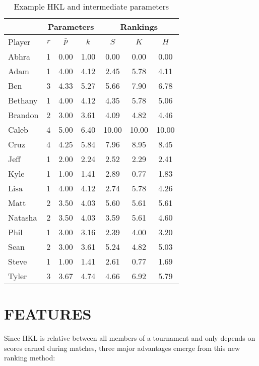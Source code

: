 \documentclass[letterpaper, 10 pt, conference]{ieeeconf}  %
\begin{document}
\begin{table}[hb]
        \begin{tabular}{lccc|ccc}
                \toprule
                        & \multicolumn{3}{c}{Parameters} & \multicolumn{3}{c}{Rankings} \\
                \midrule
                Player  & $r$   & $\bar{p}$ & $k$ & $S$ & $K$   & $H$ \\
                \midrule
                Abhra	& 1	& 0.00	& 1.00	& 0.00	& 0.00	& 0.00 \\
                Adam	& 1	& 4.00	& 4.12	& 2.45	& 5.78	& 4.11 \\
                Ben	& 3	& 4.33	& 5.27	& 5.66	& 7.90	& 6.78 \\
                Bethany	& 1	& 4.00	& 4.12	& 4.35	& 5.78	& 5.06 \\
                Brandon	& 2	& 3.00	& 3.61	& 4.09	& 4.82	& 4.46 \\
                Caleb	& 4	& 5.00	& 6.40	& 10.00	& 10.00	& 10.00 \\
                Cruz	& 4	& 4.25	& 5.84	& 7.96	& 8.95	& 8.45 \\
                Jeff	& 1	& 2.00	& 2.24	& 2.52	& 2.29	& 2.41 \\
                Kyle	& 1	& 1.00	& 1.41	& 2.89	& 0.77	& 1.83 \\
                Lisa	& 1	& 4.00	& 4.12	& 2.74	& 5.78	& 4.26 \\
                Matt	& 2	& 3.50	& 4.03	& 5.60	& 5.61	& 5.61 \\
                Natasha	& 2	& 3.50	& 4.03	& 3.59	& 5.61	& 4.60 \\
                Phil	& 1	& 3.00	& 3.16	& 2.39	& 4.00	& 3.20 \\
                Sean	& 2	& 3.00	& 3.61	& 5.24	& 4.82	& 5.03 \\
                Steve	& 1	& 1.00	& 1.41	& 2.61	& 0.77	& 1.69 \\
                Tyler	& 3	& 3.67	& 4.74	& 4.66	& 6.92	& 5.79 \\
                \bottomrule
        \end{tabular}
        \centering
        \caption{Example HKL and intermediate parameters}
        \label{tab:example-ratings}
\end{table}

\section{FEATURES}
Since HKL is relative between all members of a tournament and only depends on scores earned during matches, three major advantages emerge from this new ranking method:
\end{document}
